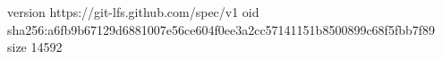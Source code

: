 version https://git-lfs.github.com/spec/v1
oid sha256:a6fb9b67129d6881007e56ce604f0ee3a2cc57141151b8500899c68f5fbb7f89
size 14592
